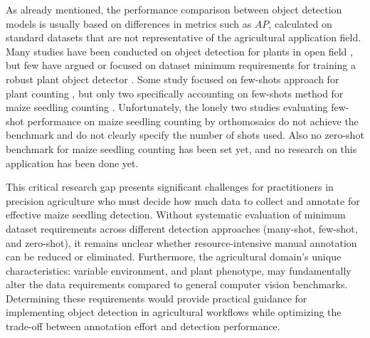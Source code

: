 \documentclass[12pt,a4paper,oneside]{report}
\begin{document}
As already mentioned, the performance comparison between object detection models is
usually based on differences in metrics such as $AP$, calculated on standard datasets
that are not representative of the agricultural application field.
Many studies have been conducted on object detection for plants in open field
\cite{barretoAutomaticUAVbasedCounting2021,gengResearchSegmentationMethod2024,jiangDeepSeedlingDeepConvolutional2019,katariIntegratingAutomatedLabeling2024,kitanoCornPlantCounting2019,liDCYOLOImprovedField2024,liSeedlingMaizeCounting2022,liuIntegrateNetDeepLearning2022,liuEstimatingMaizeSeedling2022,luTasselNetCountingMaize2017,macheferMaskRCNNRefitting2020,velumaniEstimatesMaizePlant2021,wangPlotLevelMaizeEarly2023,zhaoStudyLightweightModel2023},
but few have argued or focused on dataset minimum requirements for training a robust plant object detector
\cite{davidPlantDetectionCounting2021,andvaagCountingCanolaGeneralizable2024}.
Some study focused on few-shots approach for plant counting \cite{wangPlotLevelMaizeEarly2023,amirkolaeeAdaTreeFormerFewShot2024},
but only two specifically accounting on few-shots method for maize seedling counting \cite{karamiAutomaticPlantCounting2020,wangAdvancingImageRecognition2024}.
Unfortunately, the lonely two studies evaluating few-shot performance on maize seedling counting 
by orthomosaics do not achieve the benchmark and do not clearly
specify the number of shots used. Also no zero-shot benchmark for maize seedling counting 
has been set yet, and no research on this application has been done yet.

This critical research gap presents significant challenges for practitioners in precision agriculture 
who must decide how much data to collect and annotate for effective maize seedling detection. Without 
systematic evaluation of minimum dataset requirements across different detection approaches (many-shot, 
few-shot, and zero-shot), it remains unclear whether resource-intensive manual annotation can be 
reduced or eliminated. Furthermore, the agricultural domain's unique characteristics: variable environment, 
and plant phenotype, may fundamentally alter the data requirements 
compared to general computer vision benchmarks. Determining these requirements would provide practical 
guidance for implementing object detection in agricultural workflows while optimizing the trade-off between 
annotation effort and detection performance.
\end{document}
